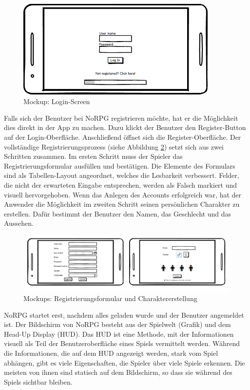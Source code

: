 			\begin{figure}[htbp]
				\centering 
				\label{mockupLogin}
				\includegraphics[width=10cm]{pics/Login.png}
				\caption{Mockup: Login-Screen}
			\end{figure}
			
			Falls sich der Benutzer bei NoRPG registrieren möchte, hat er die Möglichkeit dies direkt in der App zu machen. Dazu klickt der Benutzer den Register-Button auf der Login-Oberfläche. Anschließend öffnet sich die Register-Oberfläche. Der vollständige Registrierungsprozess (siehe Abbildung \ref{mockupsRegistrierung}) setzt sich aus zwei Schritten zusammen. Im ersten Schritt muss der Spieler das Registrierungsformular ausfüllen und bestätigen. Die Elemente des Formulars sind als Tabellen-Layout angeordnet, welches die Lesbarkeit verbessert. Felder, die nicht der erwarteten Eingabe entsprechen, werden als Falsch markiert und visuell hervorgehoben. Wenn das Anlegen des Accounts erfolgreich war, hat der Anwender die Möglichkeit im zweiten Schritt seinen persönlichen Charakter zu erstellen. Dafür bestimmt der Benutzer den Namen, das Geschlecht und das Aussehen.
			
			\begin{figure}[htbp]
				\centering 
				\label{mockupsRegistrierung}
				\includegraphics[width=\textwidth]{pics/Registerprozess.png}
				\caption{Mockups: Registrierungsformular und Charaktererstellung}
			\end{figure}
		
			NoRPG startet erst, nachdem alles geladen wurde und der Benutzer angemeldet ist. Der Bildschirm von NoRPG besteht aus der Spielwelt (Grafik) und dem Head-Up Display (HUD). Das HUD ist eine Methode, mit der Informationen visuell als Teil der Benutzeroberfläche eines Spiels vermittelt werden. Während die Informationen, die auf dem HUD angezeigt werden, stark vom Spiel abhängen, gibt es viele Eigenschaften, die Spieler über viele Spiele erkennen. Die meisten von ihnen sind statisch auf dem Bildschirm, so dass sie während des Spiels sichtbar bleiben.  
			
